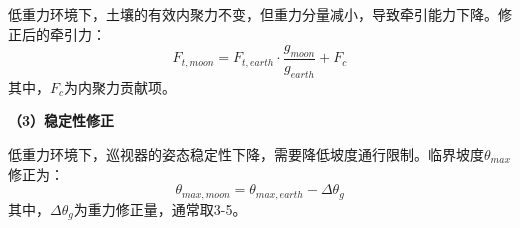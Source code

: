 低重力环境下，土壤的有效内聚力不变，但重力分量减小，导致牵引能力下降。修正后的牵引力：
\begin{equation}
    F_{t,moon} = F_{t,earth} \cdot \frac{g_{moon}}{g_{earth}} + F_c
    \label{eq:gravity_traction}
\end{equation}
其中，$F_c$为内聚力贡献项。

\textbf{（3）稳定性修正}

低重力环境下，巡视器的姿态稳定性下降，需要降低坡度通行限制。临界坡度$\theta_{max}$修正为：
\begin{equation}
    \theta_{max,moon} = \theta_{max,earth} - \Delta\theta_g
    \label{eq:gravity_stability}
\end{equation}
其中，$\Delta\theta_g$为重力修正量，通常取3-5\degree。
